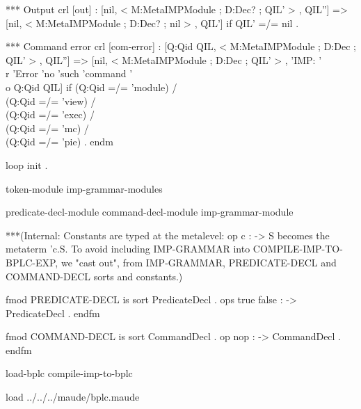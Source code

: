\documentclass[a4paper,openany]{book}
\begin{document}
 *** Output
 crl [out] : [nil, < M:MetaIMPModule ; D:Dec? ; QIL' > , QIL''] =>
             [nil, < M:MetaIMPModule ; D:Dec? ; nil > , QIL']
  if QIL' =/= nil .

 *** Command error
 crl [com-error] : [Q:Qid QIL, < M:MetaIMPModule ; D:Dec ; QIL' > , QIL''] =>
     [nil, < M:MetaIMPModule ; D:Dec ; QIL' > ,
      'IMP: '\\r 'Error 'no 'such 'command '\\o Q:Qid QIL]
  if (Q:Qid =/= 'module) /\\ (Q:Qid =/= 'view) /\\
     (Q:Qid =/= 'exec) /\\ (Q:Qid =/= 'mc) /\\ (Q:Qid =/= 'pie) .
endm

loop init .
\nwendcode{}\nwdocspar

\nwenddocs{}\endmoddef\nwstartdeflinemarkup\nwenddeflinemarkup
\LA{}token-module\RA{}
\LA{}imp-grammar-modules\RA{}
\nwendcode{}\nwdocspar

\nwenddocs{}\endmoddef\nwstartdeflinemarkup\nwenddeflinemarkup
\LA{}predicate-decl-module\RA{}
\LA{}command-decl-module\RA{}
\LA{}imp-grammar-module\RA{}
\nwendcode{}\nwdocspar

\nwenddocs{}\endmoddef\nwstartdeflinemarkup\nwenddeflinemarkup
***(Internal: Constants are typed at the metalevel: 
op c : -> S becomes the metaterm 'c.S.
To avoid including IMP-GRAMMAR into COMPILE-IMP-TO-BPLC-EXP, we
"cast out", from IMP-GRAMMAR, PREDICATE-DECL and COMMAND-DECL 
sorts and constants.)

fmod PREDICATE-DECL is
 sort PredicateDecl .
 ops true false : -> PredicateDecl .
endfm
\nwendcode{}\nwdocspar

\nwenddocs{}\endmoddef\nwstartdeflinemarkup\nwenddeflinemarkup
fmod COMMAND-DECL is
 sort CommandDecl .
 op nop : -> CommandDecl .
endfm
\nwendcode{}\nwdocspar

\nwenddocs{}\endmoddef\nwstartdeflinemarkup\nwenddeflinemarkup
\LA{}load-bplc\RA{}
\LA{}compile-imp-to-bplc\RA{}
\nwendcode{}\nwdocspar

\nwenddocs{}\endmoddef\nwstartdeflinemarkup\nwenddeflinemarkup
load ../../../maude/bplc.maude
\nwendcode{}\nwdocspar
\end{document}
